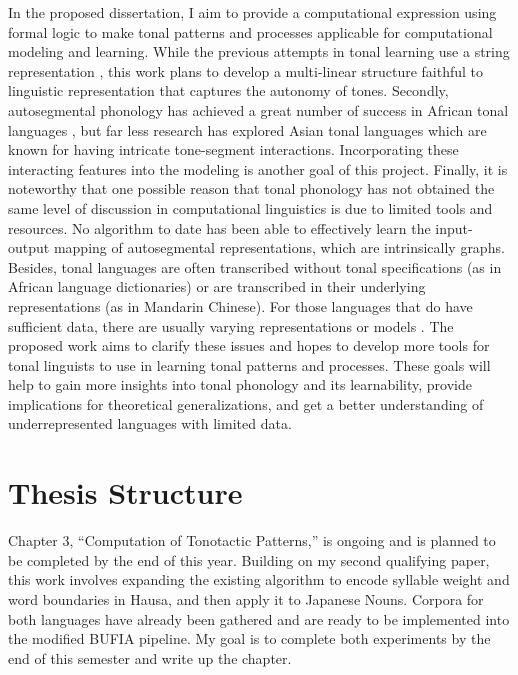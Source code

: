 In the proposed dissertation, I aim to provide a computational expression using formal logic to make tonal patterns and processes applicable for computational modeling and learning. While the previous attempts in tonal learning use a string representation \citep{chandleeComputationalAccountTone2019,oakden2020computational}, this work plans to develop a multi-linear structure faithful to linguistic representation that captures the autonomy of tones. Secondly, autosegmental phonology has achieved a great number of success in African tonal languages \citep{clements1984autosegmental,hyman2009representation}, but far less research has explored Asian tonal languages which are known for having intricate tone-segment interactions. Incorporating these interacting features into the modeling is another goal of this project. Finally, it is noteworthy that one possible reason that tonal phonology has not obtained the same level of discussion in computational linguistics is due to limited tools and resources. No algorithm to date has been able to effectively learn the input-output mapping of autosegmental representations, which are intrinsically graphs. Besides, tonal languages are often transcribed without tonal specifications (as in African language dictionaries) or are transcribed in their underlying representations (as in Mandarin Chinese). For those languages that do have sufficient data, there are usually varying representations or models \citep{bao1999structure,yip1989contour,sy1967phonological}. The proposed work aims to clarify these issues and hopes to develop more tools for tonal linguists to use in learning tonal patterns and processes. These goals will help to gain more insights into tonal phonology and its learnability, provide implications for theoretical generalizations, and get a better understanding of underrepresented languages with limited data.




\section{Thesis Structure}
	Chapter 3, ``Computation of Tonotactic Patterns,” is ongoing and is planned to be completed by the end of this year. Building on my second qualifying paper, this work involves expanding the existing algorithm to encode syllable weight and word boundaries in Hausa, and then apply it to Japanese Nouns. Corpora for both languages have already been gathered and are ready to be implemented into the modified BUFIA pipeline. My goal is to complete both experiments by the end of this semester and write up the chapter.

